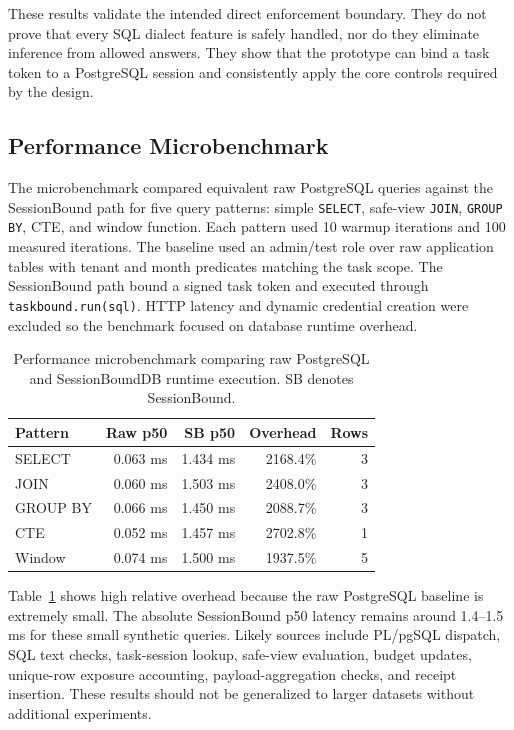\documentclass[10pt,twocolumn]{article}
\begin{document}
These results validate the intended direct enforcement boundary. They
do not prove that every SQL dialect feature is safely handled, nor do
they eliminate inference from allowed answers. They show that the
prototype can bind a task token to a PostgreSQL session and consistently
apply the core controls required by the design.

\subsection{Performance Microbenchmark}

The microbenchmark compared equivalent raw PostgreSQL queries against
the SessionBound path for five query patterns: simple \texttt{SELECT},
safe-view \texttt{JOIN}, \texttt{GROUP BY}, CTE, and window function.
Each pattern used 10 warmup iterations and 100 measured iterations. The
baseline used an admin/test role over raw application tables with
tenant and month predicates matching the task scope. The SessionBound
path bound a signed task token and executed through
\texttt{taskbound.run(sql)}. HTTP latency and dynamic credential
creation were excluded so the benchmark focused on database runtime
overhead.

\begin{table}[t]
\centering
\small
\caption{Performance microbenchmark comparing raw PostgreSQL and SessionBoundDB runtime execution. SB denotes SessionBound.}
\label{tab:performance}
\begin{tabular}{@{}lrrrr@{}}
\toprule
Pattern & Raw p50 & SB p50 & Overhead & Rows \\
\midrule
SELECT & 0.063 ms & 1.434 ms & 2168.4\% & 3 \\
JOIN & 0.060 ms & 1.503 ms & 2408.0\% & 3 \\
GROUP BY & 0.066 ms & 1.450 ms & 2088.7\% & 3 \\
CTE & 0.052 ms & 1.457 ms & 2702.8\% & 1 \\
Window & 0.074 ms & 1.500 ms & 1937.5\% & 5 \\
\bottomrule
\end{tabular}
\end{table}

Table~\ref{tab:performance} shows high relative overhead because the
raw PostgreSQL baseline is extremely small. The absolute SessionBound
p50 latency remains around 1.4--1.5 ms for these small synthetic
queries. Likely sources include PL/pgSQL dispatch, SQL text checks,
task-session lookup, safe-view evaluation, budget updates, unique-row
exposure accounting, payload-aggregation checks, and receipt insertion.
These results should not be generalized to larger datasets without
additional experiments.
\end{document}
